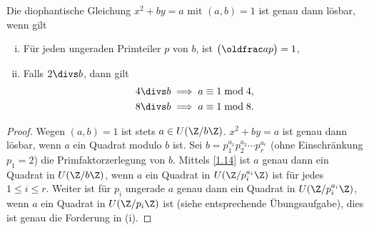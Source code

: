 \begin{st} \label{2.18}
	Die diophantische Gleichung $x^2 + by = a$ mit $(a,b) = 1$ ist genau dann lösbar, wenn gilt
	\begin{enumerate}[(i)]
		\item
			Für jeden ungeraden Primteiler $p$ von $b$, ist $\legsym ap = 1$,
		\item
			Falls $2 \divs b$, dann gilt
			\begin{align*}
				4 \divs b & \implies a \equiv 1 \bmod 4, \\
				8 \divs b & \implies a \equiv 1 \bmod 8.
			\end{align*}
	\end{enumerate}
	\begin{proof}
		Wegen $(a,b) = 1$ ist stets $a \in U(\Z / b\Z)$.
		$x^2 + by = a$ ist genau dann lösbar, wenn $a$ ein Quadrat modulo $b$ ist.
		Sei $b = p_1^{a_1} p_2^{a_2} \dotsb p_r^{a_r}$ (ohne Einschränkung $p_1 = 2$) die Primfaktorzerlegung von $b$.
		Mittels \ref{1.14} ist $a$ genau dann ein Quadrat in $U(\Z / b\Z)$, wenn $a$ ein Quadrat in $U(\Z / p_i^{a_i}\Z)$ ist für jedes $1 \le i \le r$.
		Weiter ist für $p_i$ ungerade $a$ genau dann ein Quadrat in $U(\Z / p_i^{a_i} \Z)$, wenn $a$ ein Quadrat in $U(\Z / p_i \Z)$ ist (siehe entsprechende Übungsaufgabe), dies ist genau die Forderung in (i).


\end{proof}
\end{st}
